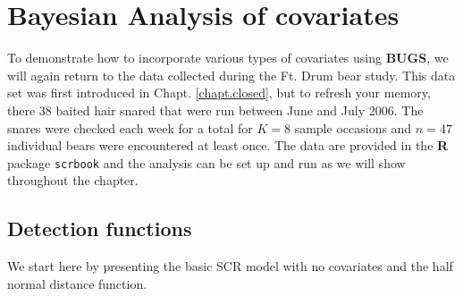 \begin{comment}
XXX whole section on this below so commented out here XXXXX
\subsection{Heterogeneity} 

Heterogeneity is a covariate that is completely latent.  This can
include many things such as an additive individual effect or an
individual-specific effect of distance.  We address these models
separately in Section 8.5 below and show a simple example of a finite
mixture model carried out in secr in Section 8.4.4.
\end{comment}

\section{Bayesian Analysis of covariates}

To demonstrate how to incorporate various types of covariates using
{\bf BUGS}, we will again return to the data collected during the
Ft. Drum bear study.  This data set was first introduced in Chapt. \ref{chapt.closed},
but to refresh your memory, there 38 baited hair snared that were run
between June and July 2006.  The snares were checked each week for a
total for $K=8$ sample occasions and $n=47$ individual bears were
encountered at least once.  The data are provided in the {\bf R}
package \mbox{\tt scrbook} and the analysis can be set up and run as
we will show throughout the chapter.

\subsection{Detection functions}

We start here by presenting the basic SCR model with no covariates and
the half normal distance function.

